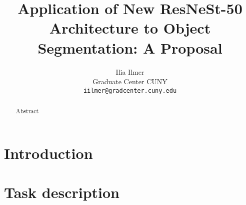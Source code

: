 \documentclass[letterpaper]{article}
\title{Application of New ResNeSt-50 Architecture to Object Segmentation: A Proposal}
\author{
    Ilia Ilmer \\
  Graduate Center CUNY \\
  \texttt{iilmer@gradcenter.cuny.edu} \\
}
\begin{document}
\maketitle
\begin{abstract}
  Abstract
\end{abstract}



\section{Introduction}


\section{Task description}
\label{sec:headings}
\end{document}
